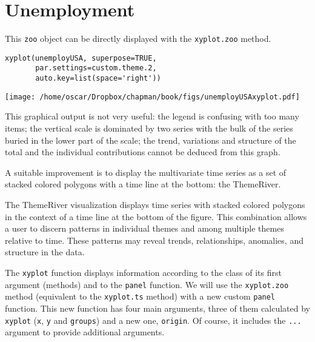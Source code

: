 


\section{Unemployment}
\label{sec-1}







  


This \texttt{zoo} object can be directly displayed with the \texttt{xyplot.zoo} method. 


\lstset{language=R}
\begin{lstlisting}
xyplot(unemployUSA, superpose=TRUE,
       par.settings=custom.theme.2,
       auto.key=list(space='right'))
\end{lstlisting}

\texttt{[image: /home/oscar/Dropbox/chapman/book/figs/unemployUSAxyplot.pdf]}


This graphical output is not very useful: the legend is confusing with
too many items; the vertical scale is dominated by two series with the
bulk of the series buried in the lower part of the scale; the trend,
variations and structure of the total and the individual contributions
cannot be deduced from this graph.

A suitable improvement is to display the multivariate time series as a
set of stacked colored polygons with a time line at the bottom: the
ThemeRiver.


\cite{Havre.Hetzler.ea2002} The ThemeRiver visualization displays
time series with stacked colored polygons in the context of a time
line at the bottom of the figure. This combination allows a user
to discern patterns in individual themes and among multiple themes
relative to time. These patterns may reveal trends, relationships,
anomalies, and structure in the data.



The \texttt{xyplot} function displays information according to the class
of its first argument (methods) and to the \texttt{panel} function. We
will use the \texttt{xyplot.zoo} method (equivalent to the \texttt{xyplot.ts}
method) with a new custom \texttt{panel} function.
This new function has four main arguments, three of them calculated by
\texttt{xyplot} (\texttt{x}, \texttt{y} and \texttt{groups}) and a new one, \texttt{origin}. Of
course, it includes the \texttt{...} argument to provide additional
arguments.


